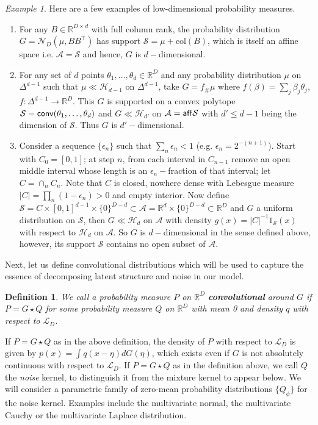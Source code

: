 \documentclass[bj,authoryear]{imsart}
\theoremstyle{plain}
\newtheorem{definition}{Definition}[section]
\theoremstyle{remark}
\newtheorem{example}{Example}
\def\aff{{\sf aff}}
\def\bbR{\mathbb{R}}
\def\cA{\mathcal{A}}
\def\cH{\mathcal{H}}
\def\cL{\mathcal{L}}
\def\cN{\mathcal{N}}
\def\cS{\mathcal{S}}
\def\conv{{\sf conv}}
\begin{document}
\begin{example}\label{example:1}
    Here are a few examples of low-dimensional probability measures.
    \begin{enumerate}[label=(\roman*)]
    \item For any $B\in\bbR^{D\times d}$ with full column rank, the probability distribution $G=\cN_D(\mu, BB^\top)$ has support $\cS=\mu + \text{col}(B)$, which is itself an affine space i.e. $\cA=\cS$ and hence, $G$ is $d-$dimensional. 
    \item For any set of $d$ points $\theta_1,\dots,\theta_d\in\bbR^D$ and any probability distribution $\mu$ on $\Delta^{d-1}$ such that $\mu\ll\cH_{d-1}$ on $\Delta^{d-1}$, take $G=f_{\#}\mu$ where $f(\beta)=\sum_j \beta_j \theta_j$, $f:\Delta^{d-1}\to \bbR^D$. This $G$ is supported on a convex polytope $\cS=\conv(\theta_1,\dots,\theta_d)$ and $G\ll \cH_{d'}$ on $\cA=\aff \cS$ with $d'\leq d-1$ being the dimension of $\cS$. Thus $G$ is $d'-$dimensional. 
    \item Consider a sequence $\{\epsilon_n\}$ such that $\sum_n \epsilon_n<1$ (e.g. $\epsilon_n=2^{-(n+1)}$). Start with $C_0=[0,1]$; at step $n$, from each interval in $C_{n-1}$ remove an open middle interval whose length is an $\epsilon_n-$fraction of that interval; let $C=\cap_n C_n$. Note that $C$ is closed, nowhere dense with Lebesgue measure $|C|=\prod_n (1-\epsilon_n)>0$ and empty interior. Now define $\cS=C\times [0,1]^{d-1}\times \{0\}^{D-d}\subset\cA=\bbR^d\times \{0\}^{D-d}\subset \bbR^D$ and $G$ a uniform distribution on $\cS$, then $G\ll \cH_d$ on $\cA$ with density $g(x)=|C|^{-1}1_{\cS}(x)$ with respect to $\cH_d$ on $\cA$. So $G$ is $d-$dimensional in the sense defined above, however, its support $\cS$ contains no open subset of $\cA$.
\end{enumerate}
\end{example}


Next, let us define convolutional distributions which will be used to capture the essence of decomposing latent structure and noise in our model. 

\begin{definition}\label{def:conv}
    We call a probability measure $P$ on $\bbR^D$ \textbf{convolutional} around $G$ if $P=G\star Q$ for some probability measure $Q$ on $\bbR^D$ with mean 0 and density $q$ with respect to $\cL_D$.
\end{definition}

If $P=G\star Q$ as in the above definition, the density of $P$ with respect to $\cL_D$ is given by $p(x)=\int q(x-\eta)dG(\eta)$, which exists even if $G$ is not absolutely continuous with respect to $\cL_D$. If $P=G\star Q$ as in the definition above, we call $Q$ the \textit{noise} kernel, to distinguish it from the mixture kernel to appear below. We will consider a parametric family of zero-mean probability distributions $\{Q_\phi\}$ for the noise kernel. Examples include the multivariate normal, the multivariate Cauchy or the multivariate Laplace distribution. 
\end{document}
